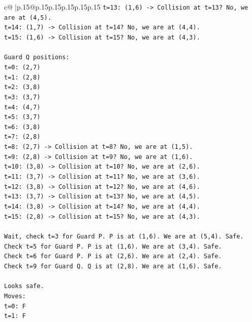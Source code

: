 \documentclass{article}
\begin{document}
{\begin{supertabular}{c@{$\;$}|p{.15\linewidth}@{}p{.15\linewidth}p{.15\linewidth}p{.15\linewidth}p{.15\linewidth}p{.15\linewidth}}
{{{\texttt{t=13: (1,6) {-}> Collision at t=13? No, we are at (4,5).} \\
\texttt{t=14: (1,7) {-}> Collision at t=14? No, we are at (4,4).} \\
\texttt{t=15: (1,6) {-}> Collision at t=15? No, we are at (4,3).} \\
\\ 
\texttt{Guard Q positions:} \\
\texttt{t=0: (2,7)} \\
\texttt{t=1: (2,8)} \\
\texttt{t=2: (3,8)} \\
\texttt{t=3: (3,7)} \\
\texttt{t=4: (4,7)} \\
\texttt{t=5: (3,7)} \\
\texttt{t=6: (3,8)} \\
\texttt{t=7: (2,8)} \\
\texttt{t=8: (2,7) {-}> Collision at t=8? No, we are at (1,5).} \\
\texttt{t=9: (2,8) {-}> Collision at t=9? No, we are at (1,6).} \\
\texttt{t=10: (3,8) {-}> Collision at t=10? No, we are at (2,6).} \\
\texttt{t=11: (3,7) {-}> Collision at t=11? No, we are at (3,6).} \\
\texttt{t=12: (3,8) {-}> Collision at t=12? No, we are at (4,6).} \\
\texttt{t=13: (3,7) {-}> Collision at t=13? No, we are at (4,5).} \\
\texttt{t=14: (3,8) {-}> Collision at t=14? No, we are at (4,4).} \\
\texttt{t=15: (2,8) {-}> Collision at t=15? No, we are at (4,3).} \\
\\ 
\texttt{Wait, check t=3 for Guard P. P is at (1,6). We are at (5,4). Safe.} \\
\texttt{Check t=5 for Guard P. P is at (1,6). We are at (3,4). Safe.} \\
\texttt{Check t=6 for Guard P. P is at (2,6). We are at (2,4). Safe.} \\
\texttt{Check t=9 for Guard Q. Q is at (2,8). We are at (1,6). Safe.} \\
\\ 
\texttt{Looks safe.} \\
\texttt{Moves:} \\
\texttt{t=0: F} \\
\texttt{t=1: F} \\
}}}
\end{supertabular}}
\end{document}
